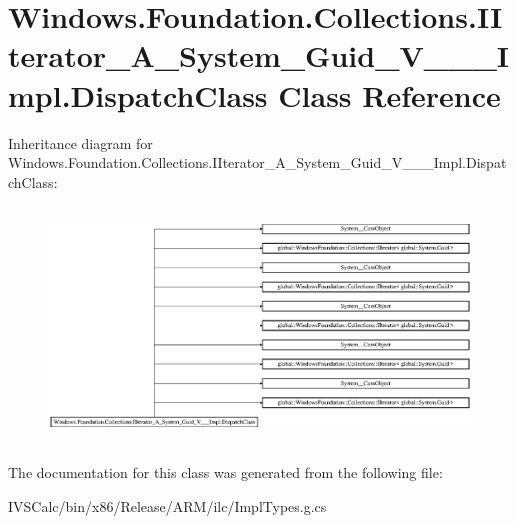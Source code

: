 \hypertarget{class_windows_1_1_foundation_1_1_collections_1_1_i_iterator___a___system___guid___v_______impl_1_1_dispatch_class}{}\section{Windows.\+Foundation.\+Collections.\+I\+Iterator\+\_\+\+A\+\_\+\+System\+\_\+\+Guid\+\_\+\+V\+\_\+\+\_\+\+\_\+\+Impl.\+Dispatch\+Class Class Reference}
\label{class_windows_1_1_foundation_1_1_collections_1_1_i_iterator___a___system___guid___v_______impl_1_1_dispatch_class}
Inheritance diagram for Windows.\+Foundation.\+Collections.\+I\+Iterator\+\_\+\+A\+\_\+\+System\+\_\+\+Guid\+\_\+\+V\+\_\+\+\_\+\+\_\+\+Impl.\+Dispatch\+Class\+:\begin{figure}[H]
\begin{center}
\leavevmode
\includegraphics[height=6.298569cm]{class_windows_1_1_foundation_1_1_collections_1_1_i_iterator___a___system___guid___v_______impl_1_1_dispatch_class}
\end{center}
\end{figure}


The documentation for this class was generated from the following file\+:\begin{DoxyCompactItemize}
\item 
I\+V\+S\+Calc/bin/x86/\+Release/\+A\+R\+M/ilc/Impl\+Types.\+g.\+cs\end{DoxyCompactItemize}
